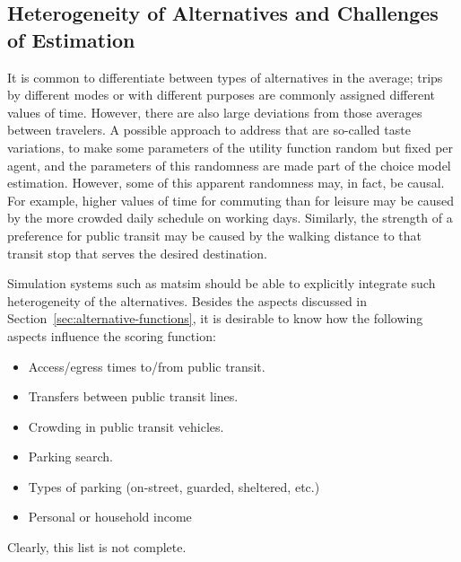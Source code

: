 \subsection{Heterogeneity of Alternatives and Challenges of Estimation}
\label{sec:estimation}

It is common to differentiate between types of alternatives in the average; \eg trips by different modes or with different purposes are commonly assigned different values of time.
%
However, there are also large deviations from those averages between travelers.
%
A possible approach to address that are so-called taste variations, \ie to make some parameters of the utility function random but fixed per agent, and the parameters of this randomness are made part of the choice model estimation.
%
However, some of this apparent randomness may, in fact, be causal.
%
For example, higher values of time for commuting than for leisure may be caused by the more crowded daily schedule on working days.  Similarly, the strength of a preference for public transit may be caused by the walking distance to that transit stop that serves the desired destination.

Simulation systems such as \gls{matsim} should be able to explicitly integrate such heterogeneity of the alternatives.  Besides the aspects discussed in Section~\ref{sec:alternative-functions}, it is desirable to know how the following aspects influence the scoring function:
\begin{itemize}

\item Access/egress times to/from public transit.

\item Transfers between public transit lines.

\item Crowding in public transit vehicles.

\item Parking search.

\item Types of parking (on-street, guarded, sheltered, etc.)

\item Personal or household income

\end{itemize}
Clearly, this list is not complete.

